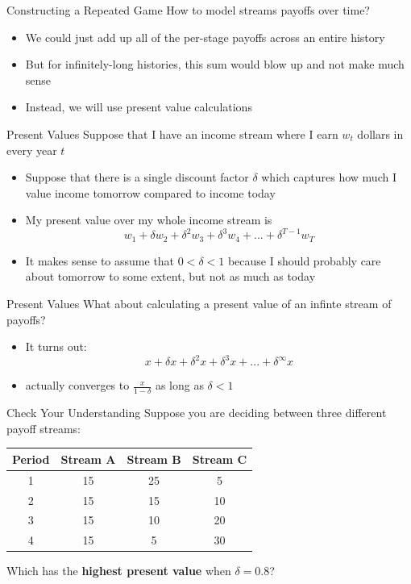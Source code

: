 \begin{frame}{Constructing a Repeated Game}
  How to model streams payoffs over time?
  \begin{itemize}
    \item We could just add up all of the per-stage payoffs across an entire history
    \item But for infinitely-long histories, this sum would blow up and not make much sense
    \item Instead, we will use \alert{present value} calculations
  \end{itemize}
\end{frame}

\begin{frame}{Present Values}
  Suppose that I have an income stream where I earn $w_t$ dollars in every year $t$
  \begin{itemize}
    \item Suppose that there is a single \alert{discount factor} $\delta$ which captures how much I value income tomorrow compared to income today
    \item My present value over my whole income stream is 
    $$ w_1 + \delta w_2 + \delta^2 w_3 + \delta^3 w_4 + ... + \delta^{T-1} w_T $$
    \item It makes sense to assume that $0<\delta<1$ because I should probably care about tomorrow to some extent, but not as much as today
  \end{itemize}
\end{frame}

\begin{frame}{Present Values}
  What about calculating a present value of an \alert{infinte stream} of payoffs?
  \begin{itemize}
    \item It turns out:  
    $$ x + \delta x + \delta^2 x + \delta^3 x + ... + \delta^{\infty} x $$
    \item actually converges to $\frac{x}{1-\delta}$ as long as $\delta<1$ 
  \end{itemize}
\end{frame}

\begin{frame}{Check Your Understanding}
  Suppose you are deciding between three different payoff streams:
  \vspace{5mm}

  \begin{center}
  \begin{tabular}{|c|c|c|c|}
    \textbf{Period} & \textbf{Stream A} & \textbf{Stream B} & \textbf{Stream C} \\ \hline 
    1 & 15 & 25 &  5 \\ 
    2 & 15 & 15 & 10 \\ 
    3 & 15 & 10 & 20 \\ 
    4 & 15 &  5 & 30 \\
  \end{tabular}
  \end{center}

  \vspace{5mm}
  Which has the \textbf{highest present value} when $\delta =0.8$?
\end{frame}

